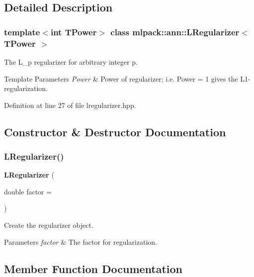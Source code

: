 \subsection{Detailed Description}
\subsubsection*{template$<$int T\+Power$>$\newline
class mlpack\+::ann\+::\+L\+Regularizer$<$ T\+Power $>$}

The L\+\_\+p regularizer for arbitrary integer p. 


\begin{DoxyTemplParams}{Template Parameters}
{\em Power} & Power of regularizer; i.\+e. Power = 1 gives the L1-\/regularization. \\
\hline
\end{DoxyTemplParams}


Definition at line 27 of file lregularizer.\+hpp.



\subsection{Constructor \& Destructor Documentation}
\mbox{\label{classmlpack_1_1ann_1_1LRegularizer_af4560ea21b7a7f93ad15a5ea65cf5c36}} 
\subsubsection{L\+Regularizer()}
{\footnotesize\ttfamily \textbf{ L\+Regularizer} (\begin{DoxyParamCaption}\item[{double}]{factor = {} }\end{DoxyParamCaption})}



Create the regularizer object. 


\begin{DoxyParams}{Parameters}
{\em factor} & The factor for regularization. \\
\hline
\end{DoxyParams}


\subsection{Member Function Documentation}
\mbox{\label{classmlpack_1_1ann_1_1LRegularizer_a77155b253292485b11241c0a4f04612a}} 
